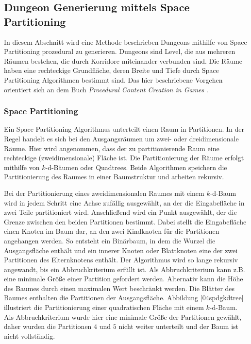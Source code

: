 \subsection{Dungeon Generierung mittels Space Partitioning}
In diesem Abschnitt wird eine Methode beschrieben Dungeons mithilfe von Space Partitioning prozedural zu generieren. Dungeons sind Level, die aus mehreren Räumen bestehen, die durch Korridore miteinander verbunden sind. Die Räume haben eine rechteckige Grundfläche, deren Breite und Tiefe durch Space Partitioning Algorithmen bestimmt sind. Das hier beschriebene Vorgehen orientiert sich an dem Buch \textit{Procedural Content Creation in Games} \cite{Shaker2016}.

\subsubsection*{Space Partitioning}
Ein Space Partitioning Algorithmus unterteilt einen Raum in Partitionen. In der Regel handelt es sich bei den Ausgangsräumen um zwei- oder dreidimensionale Räume. Hier wird angenommen, dass der zu partitionierende Raum eine rechteckige (zweidimensionale) Fläche ist. Die Partitionierung der Räume erfolgt mithilfe von $k$-d-Bäumen oder Quadtrees. Beide Algorithmen speichern die Partitionierung des Raumes in einer Baumstruktur und arbeiten rekursiv.

Bei der Partitionierung eines zweidimensionalen Raumes mit einem $k$-d-Baum wird in jedem Schritt eine Achse zufällig ausgewählt, an der die Eingabefläche in zwei Teile partitioniert wird. Anschließend wird ein Punkt ausgewählt, der die Grenze zwischen den beiden Partitionen bestimmt. Dabei stellt die Eingabefläche einen Knoten im Baum dar, an den zwei Kindknoten für die Partitionen angehangen werden. So entsteht ein Binärbaum, in dem die Wurzel die Ausgangsfläche enthält und ein innerer Knoten oder Blattknoten eine der zwei Partitionen des Elternknotens enthält. Der Algorithmus wird so lange rekursiv angewandt, bis ein Abbruchkriterium erfüllt ist. Als Abbruchkriterium kann z.B. eine minimale Größe einer Partition gefordert werden. Alternativ kann die Höhe des Baumes durch einen maximalen Wert beschränkt werden. Die Blätter des Baumes enthalten die Partitionen der Ausgangsfläche. Abbildung \ref{04spdgkdtree} illustriert die Partitionierung einer quadratischen Fläche mit einem $k$-d-Baum. Als Abbruchkriterium wurde hier eine minimale Größe der Partitionen gewählt, daher wurden die Partitionen $4$ und $5$ nicht weiter unterteilt und der Baum ist nicht vollständig. 

